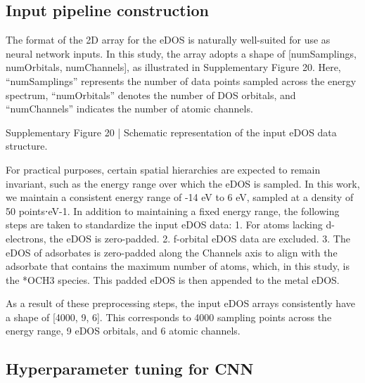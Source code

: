 \subsection{Input pipeline construction}
The format of the 2D array for the eDOS is naturally well-suited for use as neural network inputs. In this study, the array adopts a shape of [numSamplings, numOrbitals, numChannels], as illustrated in Supplementary Figure 20. Here, “numSamplings” represents the number of data points sampled across the energy spectrum, “numOrbitals” denotes the number of DOS orbitals, and “numChannels” indicates the number of atomic channels.


Supplementary Figure 20 | Schematic representation of the input eDOS data structure.

For practical purposes, certain spatial hierarchies are expected to remain invariant, such as the energy range over which the eDOS is sampled.
In this work, we maintain a consistent energy range of -14 eV to 6 eV, sampled at a density of 50 points⋅eV-1.
In addition to maintaining a fixed energy range, the following steps are taken to standardize the input eDOS data:
  1.	For atoms lacking d-electrons, the eDOS is zero-padded.
  2.	f-orbital eDOS data are excluded.
  3.	The eDOS of adsorbates is zero-padded along the Channels axis to align with the adsorbate that contains the maximum number of atoms, which, in this study, is the *OCH3 species. This padded eDOS is then appended to the metal eDOS.

As a result of these preprocessing steps, the input eDOS arrays consistently have a shape of [4000, 9, 6]. This corresponds to 4000 sampling points across the energy range, 9 eDOS orbitals, and 6 atomic channels.


\subsection{Hyperparameter tuning for CNN}

